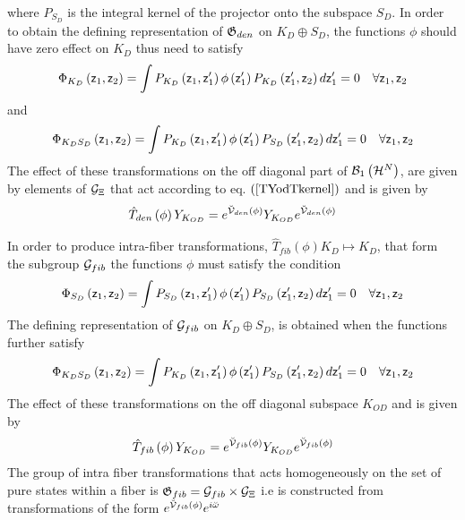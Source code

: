 where $P_{S_{D}}$ is the integral kernel of the projector onto the subspace $%
S_{D}$. In order to obtain the defining representation of ${\frak G}_{den}$
on $K_{D}\oplus S_{D}$, the functions $\phi $ should have zero effect on $%
K_{D}$ thus need to satisfy 
\begin{equation}
\Phi _{K_{D}}\left( {\sf z}_{1},{\sf z}_{2}\right) =\int P_{K_{D}}\left( 
{\sf z}_{1},{\sf z}_{1}^{\prime }\right) \phi \left( {\sf z}_{1}^{\prime
}\right) P_{K_{D}}\left( {\sf z}_{1}^{\prime },{\sf z}_{2}\right) d{\sf z}%
_{1}^{\prime }=0\quad \forall {\sf z}_{1},{\sf z}_{2}  \label{projK}
\end{equation}%
and 
\begin{equation}
\Phi _{K_{D}S_{D}}\left( {\sf z}_{1},{\sf z}_{2}\right) =\int
P_{K_{D}}\left( {\sf z}_{1},{\sf z}_{1}^{\prime }\right) \phi \left( {\sf z}%
_{1}^{\prime }\right) P_{S_{D}}\left( {\sf z}_{1}^{\prime },{\sf z}%
_{2}\right) d{\sf z}_{1}^{\prime }=0\quad \forall {\sf z}_{1},{\sf z}_{2}
\label{projKS}
\end{equation}%
The effect of these transformations on the off diagonal part of ${\cal B}%
_{1}\left( {\cal H}^{N}\right) $, are given by elements of ${\cal G}_{\Xi }$
that act according to eq. $\left( \ref{TYodTkernel}\right) $ and is given by 
\begin{equation}
\hat{T}_{den}\left( \phi \right) Y_{K_{OD}}=e^{{\cal \breve{V}}_{den}\left(
\phi \right) }Y_{K_{OD}}e^{{\cal \breve{V}}_{den}\left( \phi \right) }
\end{equation}

In order to produce intra-fiber transformations, $\hat{T}_{fib}\left( \phi
\right) K_{D}\mapsto K_{D}$, that form the subgroup ${\cal G}_{fib}$ the
functions $\phi $ must satisfy the condition 
\begin{equation}
\Phi _{S_{D}}\left( {\sf z}_{1},{\sf z}_{2}\right) =\int P_{S_{D}}\left( 
{\sf z}_{1},{\sf z}_{1}^{\prime }\right) \phi \left( {\sf z}_{1}^{\prime
}\right) P_{S_{D}}\left( {\sf z}_{1}^{\prime },{\sf z}_{2}\right) d{\sf z}%
_{1}^{\prime }=0\quad \forall {\sf z}_{1},{\sf z}_{2}
\end{equation}%
The defining representation of ${\cal G}_{fib}$ on $K_{D}\oplus S_{D}$, is
obtained when the functions further satisfy 
\begin{equation}
\Phi _{K_{D}S_{D}}\left( {\sf z}_{1},{\sf z}_{2}\right) =\int
P_{K_{D}}\left( {\sf z}_{1},{\sf z}_{1}^{\prime }\right) \phi \left( {\sf z}%
_{1}^{\prime }\right) P_{S_{D}}\left( {\sf z}_{1}^{\prime },{\sf z}%
_{2}\right) d{\sf z}_{1}^{\prime }=0\quad \forall {\sf z}_{1},{\sf z}_{2}
\end{equation}%
The effect of these transformations on the off diagonal subspace $K_{OD}$
and is given by 
\begin{equation}
\hat{T}_{fib}\left( \phi \right) Y_{K_{OD}}=e^{{\cal \breve{V}}_{fib}\left(
\phi \right) }Y_{K_{OD}}e^{{\cal \breve{V}}_{fib}\left( \phi \right) }
\end{equation}%
The group of intra fiber transformations that acts homogeneously on the set
of pure states within a fiber is ${\frak G}_{fib}={\cal G}_{fib}\times {\cal %
G}_{\Xi }$ i.e is constructed from transformations of the form $e^{{\cal 
\breve{V}}_{fib}\left( \phi \right) }e^{i\breve{\omega}}$

